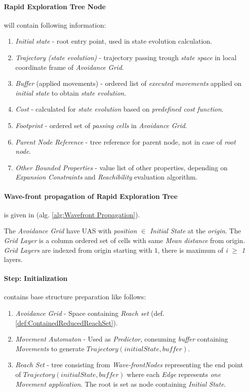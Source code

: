 \newpage
\paragraph{Rapid Exploration Tree Node} will contain following information:
\begin{enumerate}
    \item \emph{Initial state} - root entry point, used in state evolution calculation.
    \item \emph{Trajectory (state evolution)} - trajectory passing trough \emph{state space} in local coordinate frame of \emph{Avoidance Grid}.
    \item \emph{Buffer} (applied movements) - ordered list of \emph{executed movements} applied on \emph{initial state} to obtain \emph{state evolution}.
    \item \emph{Cost} - calculated for \emph{state evolution} based on \emph{predefined cost function}. 
    \item \emph{Footprint} - ordered set of \emph{passing cells} in \emph{Avoidance Grid}.
    \item \emph{Parent Node Reference} - tree reference for parent node, not in case of \emph{root node}.
    \item \emph{Other Bounded Properties} - value list of other properties, depending on \emph{Expansion Constraints} and \emph{Reachibility} evaluation algorithm.
\end{enumerate}

\paragraph{Wave-front propagation of Rapid Exploration Tree} is given in (alg. \ref{alg:Wavefront Propagation}). 

The \emph{Avoidance Grid} have UAS with \emph{position $\in$ Initial State} at the \emph{origin}. The \emph{Grid Layer} is a column ordered set of cells with same \emph{Mean distance} from origin. \emph{Grid Layers} are indexed from origin starting with $1$, there is maximum of \emph{i $\ge$ 1} layers.

\paragraph{Step: Initialization} contains base structure preparation like follows:
\begin{enumerate}
    \item \emph{Avoidance Grid} - Space containing \emph{Reach set} (def. \ref{def:ContainedReducedReachSet}).
    \item \emph{Movement Automaton} - Used as \emph{Predictor}, consuming \emph{buffer} containing \emph{Movements} to generate $Trajectory(initialState,buffer)$.
    
    \item \emph{Reach Set} -  tree consisting from \emph{Wave-frontNodes} representing the end point of $Trajectory(initialState,buffer)$ where each \emph{Edge} represents \emph{one Movement application}. The root is set as node containing \emph{Initial State}.
\end{enumerate}

